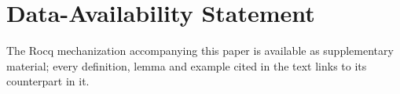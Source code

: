 \documentclass[acmsmall,screen,review,anonymous,nonacm]{acmart}
\begin{document}












\section*{Data-Availability Statement}

The Rocq mechanization accompanying this paper is available as supplementary
material; every definition, lemma and example cited in the text links to its
counterpart in it. 




\clearpage
\appendix


\end{document}
